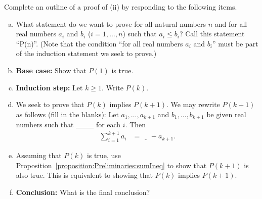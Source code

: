 \begin{exercise}{}
Complete an outline of a proof of (ii) by responding to the following items.
\begin{enumerate}[(a)]
\item
What statement do we want to prove  for all natural numbers $n$ and for all real numbers $a_i$ and $b_i$ ($i=1,\dots,n$)
such that $a_i\le b_i$? Call this statement ``P(n)''.
(Note that the condition ``for all real numbers $a_i$ and $b_i$''
must be part of the induction statement we seek to prove.)
\item
\textbf{Base case:} Show that $P(1)$ is true.
\item
\textbf{Induction step:}  Let $k\ge 1$. Write $P(k)$.
\item
We seek to prove that $P(k)$ implies $P(k+1)$.  We may rewrite $P(k+1)$ as follows (fill in the blanks):
Let $a_1,\dots,a_{k+1}$ and $b_1,\dots,b_{k+1}$ be given real numbers
such that \underline{~~~~~} for each $i$.
Then
\begin{align*}
\sum_{i=1}^{k+1}a_i
&=\underline{~~~~~} + a_{k+1}.
\end{align*}
\item
Assuming that $P(k)$ is true, use  Proposition~\ref{proposition:Preliminaries:sumIneq} to show that $P(k+1)$ is also true.  This is equivalent to showing that $P(k)$ implies $P(k+1)$.
\item 
\textbf{Conclusion:} What is the final conclusion?
\end{enumerate}
\end{exercise}


